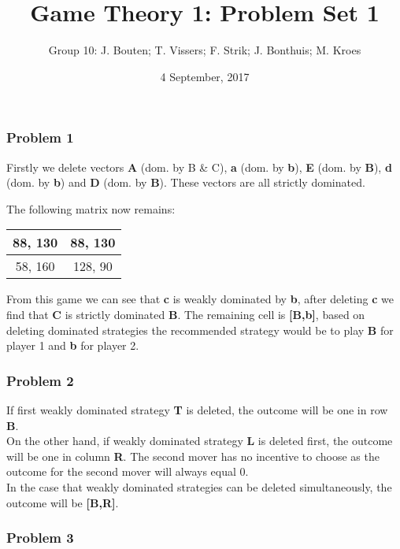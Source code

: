 \documentclass[]{article}
\author{Group 10: J. Bouten; T. Vissers; F. Strik; J. Bonthuis; M. Kroes}
\date{4 September, 2017}
\title{Game Theory 1: Problem Set 1}
\begin{document}
\maketitle



\subsubsection{Problem 1}\label{problem-1}

Firstly we delete vectors \textbf{A} (dom. by B & C), \textbf{a} (dom. by \textbf{b}), \textbf{E} (dom. by \textbf{B}), \textbf{d} (dom. by \textbf{b})
and \textbf{D} (dom. by \textbf{B}). These vectors are all strictly dominated.

The following matrix now remains:

\begin{tabular}{| c | c |}
  \hline			
  88, 130 &  88, 130 \\
\hline
  58, 160 & 128, 90 \\
  \hline  
\end{tabular}

From this game we can see that \textbf{c} is weakly dominated by \textbf{b}, after
deleting \textbf{c} we find that \textbf{C} is strictly dominated \textbf{B}. The
remaining cell is \textbf{[B,b]}, based on deleting dominated
strategies the recommended strategy would be to play \textbf{B} for
player 1 and \textbf{b} for player 2.


\subsubsection{Problem 2}\label{problem-2}

If first weakly dominated strategy \textbf{T} is deleted, the outcome will be one in row \textbf{B}. \\

On the other hand, if weakly dominated strategy \textbf{L} is deleted first, the outcome will be one in column \textbf{R}.
The second mover has no incentive to choose as the outcome for the second mover will always equal 0. \\

In the case that weakly dominated strategies can be deleted simultaneously, the outcome will be \textbf{[B,R]}.
\subsubsection{Problem 3}\label{problem-3}
\end{document}
